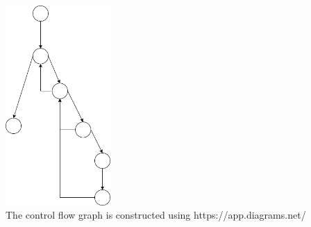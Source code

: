 \documentclass[12pt]{article}
\begin{document}
\begin{center}
  \includegraphics[width=0.3\textwidth]{Control_Flow_Graph.png} \\
  The control flow graph is constructed using https://app.diagrams.net/
\end{center}
\end{document}
